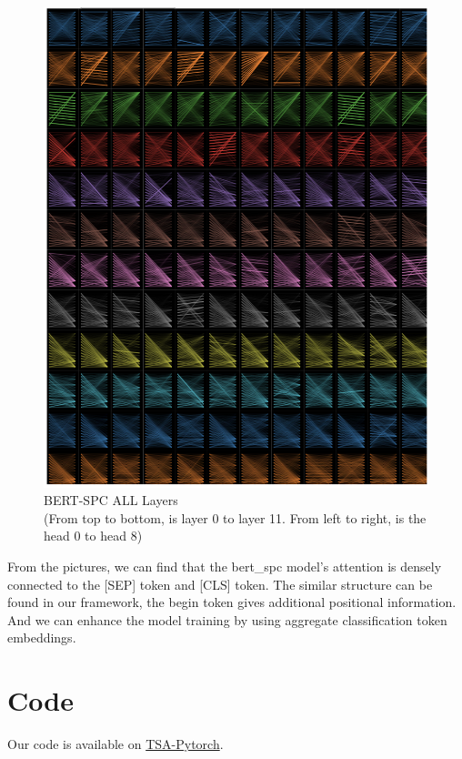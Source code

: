 \documentclass[fyp]{socreport}
\begin{document}
\begin{figure}[h]
    \centering
    \includegraphics[width=\linewidth]{./image/spc_all.png}
    \caption{BERT-SPC ALL Layers\\
    (From top to bottom, is layer 0 to layer 11. From left to right, is the head 0 to head 8)}
  \label{spc_all}
\end{figure}


From the pictures, we can find that the bert\_spc model's attention is densely connected to the [SEP] token and [CLS] token. The similar structure can be found in our framework, the begin token gives additional positional information. And we can enhance the model training by using aggregate classification token embeddings.



\chapter{Code}
Our code is available on \href{https://github.com/Xiang-Pan/TSA-PyTorch}{TSA-Pytorch}.
\end{document}

